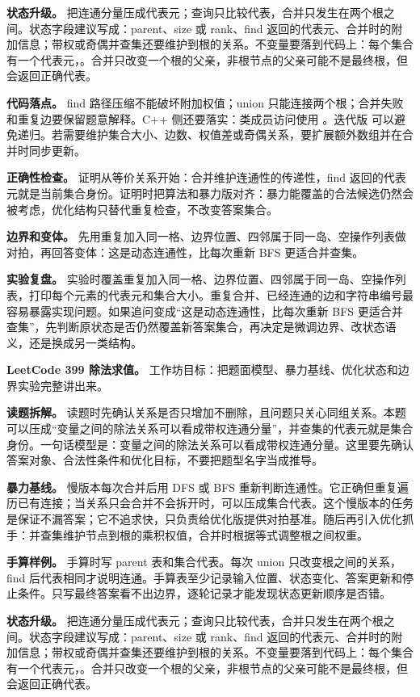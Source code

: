 \textbf{状态升级。} 把连通分量压成代表元；查询只比较代表，合并只发生在两个根之间。状态字段建议写成：parent、size 或 rank、find 返回的代表元、合并时的附加信息；带权或奇偶并查集还要维护到根的关系。不变量要落到代码上：每个集合有一个代表元，。合并只改变一个根的父亲，非根节点的父亲可能不是最终根，但  会返回正确代表。

\textbf{代码落点。} find 路径压缩不能破坏附加权值；union 只能连接两个根；合并失败和重复边要保留题意解释。C++ 侧还要落实：类成员访问使用 。迭代版  可以避免递归。若需要维护集合大小、边数、权值差或奇偶关系，要扩展额外数组并在合并时同步更新。

\textbf{正确性检查。} 证明从等价关系开始：合并维护连通性的传递性，find 返回的代表元就是当前集合身份。证明时把算法和暴力版对齐：暴力能覆盖的合法候选仍然会被考虑，优化结构只替代重复检查，不改变答案集合。

\textbf{边界和变体。} 先用重复加入同一格、边界位置、四邻属于同一岛、空操作列表做对拍，再回答变体：这是动态连通性，比每次重新 BFS 更适合并查集。

\textbf{实验复盘。} 实验时覆盖重复加入同一格、边界位置、四邻属于同一岛、空操作列表，打印每个元素的代表元和集合大小。重复合并、已经连通的边和字符串编号最容易暴露实现问题。如果追问变成“这是动态连通性，比每次重新 BFS 更适合并查集”，先判断原状态是否仍然覆盖新答案集合，再决定是微调边界、改状态语义，还是换成另一类结构。

\noindent\textbf{LeetCode 399 除法求值。} 工作坊目标：把题面模型、暴力基线、优化状态和边界实验完整讲出来。

\textbf{读题拆解。} 读题时先确认关系是否只增加不删除，且问题只关心同组关系。本题可以压成“变量之间的除法关系可以看成带权连通分量”，并查集的代表元就是集合身份。一句话模型是：变量之间的除法关系可以看成带权连通分量。这里要先确认答案对象、合法性条件和优化目标，不要把题型名字当成推导。

\textbf{暴力基线。} 慢版本每次合并后用 DFS 或 BFS 重新判断连通性。它正确但重复遍历已有连接；当关系只会合并不会拆开时，可以压成集合代表。这个慢版本的任务是保证不漏答案；它不追求快，只负责给优化版提供对拍基准。随后再引入优化抓手：并查集维护节点到根的乘积权值，合并时根据等式调整根之间权重。

\textbf{手算样例。} 手算时写 parent 表和集合代表。每次 union 只改变根之间的关系，find 后代表相同才说明连通。手算表至少记录输入位置、状态变化、答案更新和停止条件。只写最终答案看不出边界，逐轮记录才能发现状态更新顺序是否错。

\textbf{状态升级。} 把连通分量压成代表元；查询只比较代表，合并只发生在两个根之间。状态字段建议写成：parent、size 或 rank、find 返回的代表元、合并时的附加信息；带权或奇偶并查集还要维护到根的关系。不变量要落到代码上：每个集合有一个代表元，。合并只改变一个根的父亲，非根节点的父亲可能不是最终根，但  会返回正确代表。

